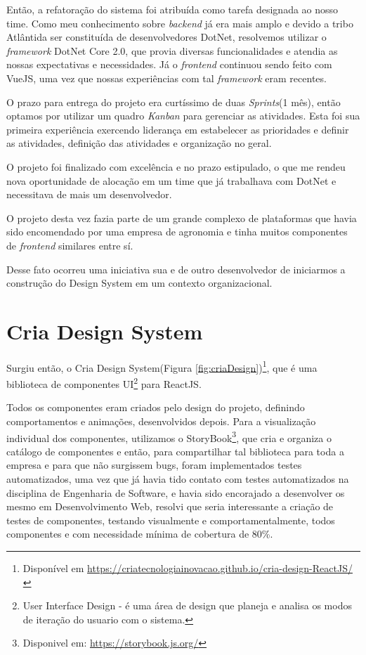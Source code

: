 Então, a refatoração do sistema foi atribuída como tarefa designada ao nosso time.
Como meu conhecimento sobre \textit{backend} já era mais amplo e devido a tribo Atlântida ser constituída de desenvolvedores DotNet, resolvemos utilizar o \textit{framework} DotNet Core 2.0, que 
provia diversas funcionalidades e atendia as nossas expectativas e necessidades.
Já o \textit{frontend} continuou sendo feito com VueJS, uma vez que nossas experiências com tal \textit{framework} eram recentes.

O prazo para entrega do projeto era curtíssimo de duas \textit{Sprints}(1 mês), então optamos por utilizar um quadro \textit{Kanban} para gerenciar as atividades.
Esta foi sua primeira experiência exercendo liderança em estabelecer as prioridades e definir as atividades, definição das atividades e organização no geral.

O projeto foi finalizado com excelência e no prazo estipulado, o que me rendeu nova oportunidade de alocação em um time que já trabalhava com DotNet e necessitava de mais um desenvolvedor.

O projeto desta vez fazia parte de um grande complexo de plataformas que havia sido encomendado por uma empresa de agronomia e tinha muitos componentes de \textit{frontend} similares entre sí.

Desse fato ocorreu uma iniciativa sua e de outro desenvolvedor de iniciarmos a construção do Design System em um contexto organizacional.

\section{Cria Design System}
Surgiu então, o Cria Design System(Figura \ref{fig:criaDesign})\footnote{Disponível em \url{https://criatecnologiainovacao.github.io/cria-design-ReactJS/}}, que é uma biblioteca de componentes UI\footnote{User Interface Design - é uma área de design que planeja e analisa os modos de iteração do usuario com o sistema.} para ReactJS.

Todos os componentes eram criados pelo design do projeto, definindo comportamentos e animações, desenvolvidos depois. Para a visualização individual dos componentes, utilizamos o StoryBook\footnote{Disponivel em: \url{https://storybook.js.org/}},
que cria e organiza o catálogo de componentes e então, para compartilhar tal biblioteca para toda a empresa e para que não surgissem bugs, foram implementados testes automatizados, 
uma vez que já havia tido contato com testes automatizados na disciplina de Engenharia de Software, e havia sido encorajado a desenvolver os mesmo em Desenvolvimento Web, resolvi que seria interessante a criação de testes de componentes, testando visualmente e comportamentalmente,
todos componentes e com necessidade mínima de cobertura de 80\%.

